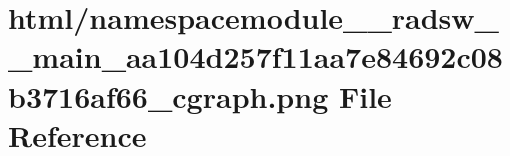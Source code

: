 \hypertarget{namespacemodule____radsw____main__aa104d257f11aa7e84692c08b3716af66__cgraph_8png}{}\section{html/namespacemodule\+\_\+\+\_\+radsw\+\_\+\+\_\+main\+\_\+aa104d257f11aa7e84692c08b3716af66\+\_\+cgraph.png File Reference}
\label{namespacemodule____radsw____main__aa104d257f11aa7e84692c08b3716af66__cgraph_8png}
